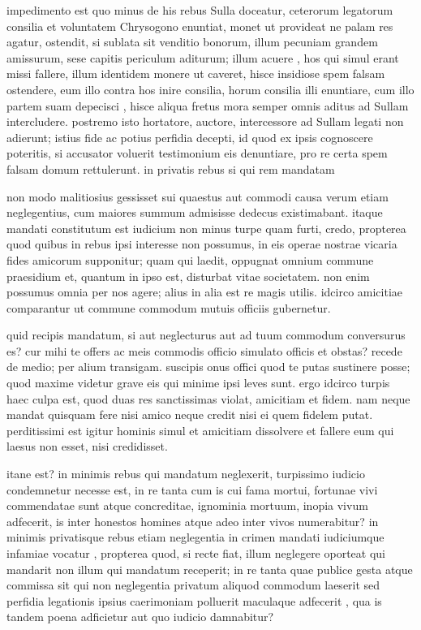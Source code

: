  impedimento est quo minus de his rebus Sulla doceatur, ceterorum legatorum consilia et voluntatem Chrysogono enuntiat, monet ut provideat ne palam res agatur, ostendit, si sublata sit venditio bonorum, illum pecuniam grandem amissurum, sese capitis periculum aditurum; illum acuere , hos qui simul erant missi fallere, illum identidem monere ut caveret, hisce insidiose spem falsam ostendere, eum illo contra hos inire consilia, horum consilia illi enuntiare, cum illo partem suam depecisci , hisce aliqua fretus mora semper omnis aditus ad Sullam intercludere. postremo isto hortatore, auctore, intercessore ad Sullam legati non adierunt; istius fide ac potius perfidia decepti, id quod ex ipsis cognoscere poteritis, si accusator voluerit testimonium eis denuntiare, pro re certa spem falsam domum rettulerunt. in privatis rebus si qui rem mandatam

 non modo malitiosius gessisset sui quaestus aut commodi causa verum etiam neglegentius, cum maiores summum admisisse dedecus existimabant. itaque mandati constitutum est iudicium non minus turpe quam furti, credo, propterea quod quibus in rebus ipsi interesse non possumus, in eis operae nostrae vicaria fides amicorum supponitur; quam qui laedit, oppugnat omnium commune praesidium et, quantum in ipso est, disturbat vitae societatem. non enim possumus omnia per nos agere; alius in alia est re magis utilis. idcirco amicitiae comparantur ut commune commodum mutuis officiis gubernetur.

 quid recipis mandatum, si aut neglecturus aut ad tuum commodum conversurus es? cur mihi te offers ac meis commodis officio simulato officis et obstas? recede de medio; per alium transigam. suscipis onus offici quod te putas sustinere posse; quod maxime videtur grave eis qui minime ipsi leves sunt. ergo idcirco turpis haec culpa est, quod duas res sanctissimas violat, amicitiam et fidem. nam neque mandat quisquam fere nisi amico neque credit nisi ei quem fidelem putat. perditissimi est igitur hominis simul et amicitiam dissolvere et fallere eum qui laesus non esset, nisi credidisset.

 itane est? in minimis rebus qui mandatum neglexerit, turpissimo iudicio condemnetur necesse est, in re tanta cum is cui fama mortui, fortunae vivi commendatae sunt atque concreditae, ignominia mortuum, inopia vivum adfecerit, is inter honestos homines atque adeo inter vivos numerabitur? in minimis privatisque rebus etiam neglegentia in crimen mandati iudiciumque infamiae vocatur , propterea quod, si recte fiat, illum neglegere oporteat qui mandarit non illum qui mandatum receperit; in re tanta quae publice gesta atque commissa sit qui non neglegentia privatum aliquod commodum laeserit sed perfidia legationis ipsius caerimoniam polluerit maculaque adfecerit , qua is tandem poena adficietur aut quo iudicio damnabitur?

